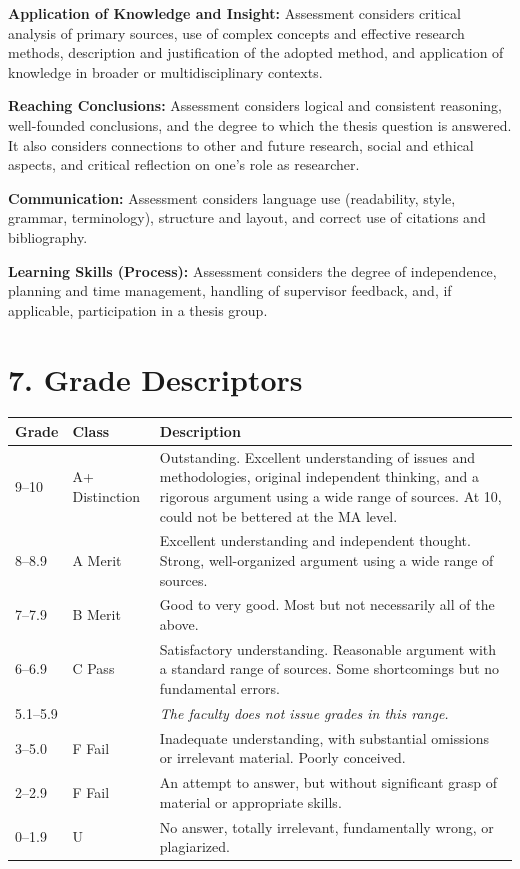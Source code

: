 \documentclass[11pt,a4paper]{article}
\begin{document}
\textbf{Application of Knowledge and Insight:} Assessment considers critical analysis of primary sources, use of complex concepts and effective research methods, description and justification of the adopted method, and application of knowledge in broader or multidisciplinary contexts.

\textbf{Reaching Conclusions:} Assessment considers logical and consistent reasoning, well-founded conclusions, and the degree to which the thesis question is answered. It also considers connections to other and future research, social and ethical aspects, and critical reflection on one's role as researcher.

\textbf{Communication:} Assessment considers language use (readability, style, grammar, terminology), structure and layout, and correct use of citations and bibliography.

\textbf{Learning Skills (Process):} Assessment considers the degree of independence, planning and time management, handling of supervisor feedback, and, if applicable, participation in a thesis group.

\section{7. Grade Descriptors}

\begin{center}
\small
\begin{tabularx}{\textwidth}{llX}
\toprule
\textbf{Grade} & \textbf{Class} & \textbf{Description} \\
\midrule
9--10 & A+ Distinction & Outstanding. Excellent understanding of issues and methodologies, original independent thinking, and a rigorous argument using a wide range of sources. At 10, could not be bettered at the MA level. \\
\midrule
8--8.9 & A Merit & Excellent understanding and independent thought. Strong, well-organized argument using a wide range of sources. \\
\midrule
7--7.9 & B Merit & Good to very good. Most but not necessarily all of the above. \\
\midrule
6--6.9 & C Pass & Satisfactory understanding. Reasonable argument with a standard range of sources. Some shortcomings but no fundamental errors. \\
\midrule
5.1--5.9 & & \textit{The faculty does not issue grades in this range.} \\
\midrule
3--5.0 & F Fail & Inadequate understanding, with substantial omissions or irrelevant material. Poorly conceived. \\
\midrule
2--2.9 & F Fail & An attempt to answer, but without significant grasp of material or appropriate skills. \\
\midrule
0--1.9 & U & No answer, totally irrelevant, fundamentally wrong, or plagiarized. \\
\bottomrule
\end{tabularx}
\end{center}
\end{document}
